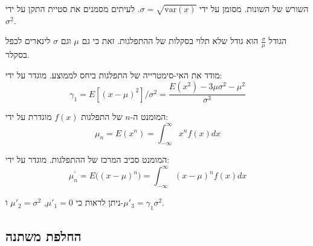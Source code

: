 \documentclass{tstextbook}
\begin{document}
\begin{definition}
השורש של השונות. מסומן על ידי \(\sigma=\sqrt{ \mathrm{var}(x) }\). לעיתים מסמנים את סטיית התקן על ידי \(\sigma^{2}\).

\end{definition}
\begin{remark}
הגודל \(\frac{\sigma}{\mu}\) הוא גודל שלא תלוי בסקלות של ההתפלגות. זאת כי גם \(\mu\) וגם \(\sigma\) לינארים לכפל בסקלר.

\end{remark}
\begin{definition}[צידוד]
מודד את האי-סימטרייה של התפלגות ביחס לממוצע. מוגדר על ידי:
$$\gamma_{1}=E[(x-\mu)^{2}]/\sigma^{2}={\frac{E(x^{2})-3\mu\sigma^{2}-\mu^{2}}{\sigma^{3}}}$$

\end{definition}
\begin{definition}[מומנט]
המומנט ה-\(n\) של התפלגות \(f(x)\) מוגדרת על ידי:
$$\mu_{n}=E(x^{n})=\int_{-\infty}^{\infty}x^{n}f(x)d x$$

\end{definition}
\begin{definition}
המומנט סביב המרכז של ההתפלגות. מוגדר על ידי:
$$\mu_{n}^{\prime}=E{\big(}(x-\mu)^{n}{\big)}=\int_{-\infty}^{\infty}(x-\mu)^{n}f(x)d x$$

\end{definition}
\begin{corollary}
ניתן לראות כי \(\mu'_{1}= 0\), \(\mu'_{2}=\sigma^{2}\) ו-\(\mu'_{3}=\gamma_{1}\sigma^{2}\).

\end{corollary}
\subsection{החלפת משתנה}
\end{document}
